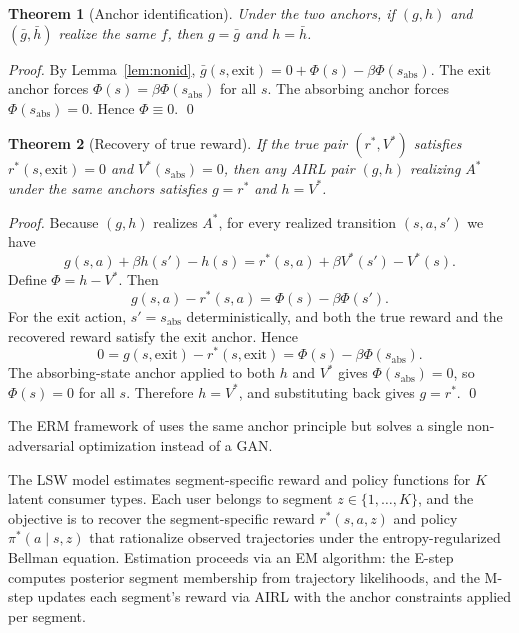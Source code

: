 \documentclass[11pt]{article}
\newtheorem{theorem}{Theorem}
\begin{document}
\begin{theorem}[Anchor identification]\label{thm:anchor}
Under the two anchors, if $(g,h)$ and $(\bar{g},\bar{h})$ realize the same $f$, then $g = \bar{g}$ and $h = \bar{h}$.
\end{theorem}
\begin{proof}
By Lemma~\ref{lem:nonid}, $\bar{g}(s,\text{exit}) = 0 + \Phi(s) - \beta\Phi(s_{\mathrm{abs}})$. The exit anchor forces $\Phi(s) = \beta\Phi(s_{\mathrm{abs}})$ for all $s$. The absorbing anchor forces $\Phi(s_{\mathrm{abs}}) = 0$. Hence $\Phi \equiv 0$. \qed
\end{proof}

\begin{theorem}[Recovery of true reward]\label{thm:recovery}
If the true pair $(r^*, V^*)$ satisfies $r^*(s,\text{exit}) = 0$ and $V^*(s_{\mathrm{abs}}) = 0$, then any AIRL pair $(g,h)$ realizing $A^*$ under the same anchors satisfies $g = r^*$ and $h = V^*$.
\end{theorem}
\begin{proof}
Because $(g,h)$ realizes $A^*$, for every realized transition $(s,a,s')$ we have
\[
g(s,a) + \beta h(s') - h(s) = r^*(s,a) + \beta V^*(s') - V^*(s).
\]
Define $\Phi = h - V^*$. Then
\[
g(s,a) - r^*(s,a) = \Phi(s) - \beta\Phi(s').
\]
For the exit action, $s' = s_{\mathrm{abs}}$ deterministically, and both the true reward and the recovered reward satisfy the exit anchor. Hence
\[
0 = g(s,\text{exit}) - r^*(s,\text{exit}) = \Phi(s) - \beta\Phi(s_{\mathrm{abs}}).
\]
The absorbing-state anchor applied to both $h$ and $V^*$ gives $\Phi(s_{\mathrm{abs}}) = 0$, so $\Phi(s) = 0$ for all $s$. Therefore $h = V^*$, and substituting back gives $g = r^*$. \qed
\end{proof}

The ERM framework of \citet{kang2025} uses the same anchor principle but solves a single non-adversarial optimization instead of a GAN.

The LSW model estimates segment-specific reward and policy functions for $K$ latent consumer types. Each user belongs to segment $z \in \{1, \ldots, K\}$, and the objective is to recover the segment-specific reward $r^*(s, a, z)$ and policy $\pi^*(a \mid s, z)$ that rationalize observed trajectories under the entropy-regularized Bellman equation. Estimation proceeds via an EM algorithm: the E-step computes posterior segment membership from trajectory likelihoods, and the M-step updates each segment's reward via AIRL with the anchor constraints applied per segment.
\end{document}
